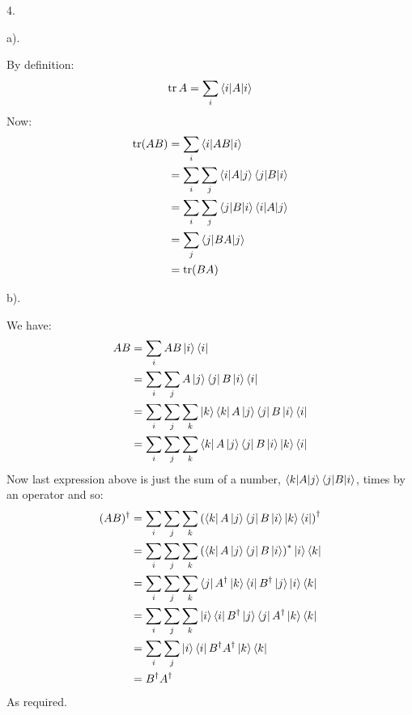 \documentclass[a4paper,12pt]{article}
\begin{document}
4.
\begin{minipage}[t]{0.9\textwidth}
  a).
  \begin{minipage}[t]{\textwidth}
    By definition:
    \begin{equation*}
      \trace{A} = \sum_i \braket{i|A|i}
    \end{equation*}
    Now:
    \begin{align*}
      \trace(AB) &= \sum_i \braket{i|AB|i}\\
                 &= \sum_i\sum_j \braket{i|A|j}\braket{j|B|i}\\
                 &= \sum_i\sum_j \braket{j|B|i}\braket{i|A|j}\\
                 &= \sum_j \braket{j|BA|j}\\
                 &= \trace(BA)
    \end{align*}

  \end{minipage}

  b).
  \begin{minipage}[t]{\textwidth}
    We have:
    \begin{align*}
      AB &= \sum_{i} AB\ket{i}\bra{i}\\
         &= \sum_{i}\sum_{j} A\ket{j} \bra{j}B\ket{i}\bra{i}\\
         &= \sum_{i}\sum_{j}\sum_{k} \ket{k} \bra{k}A\ket{j} \bra{j}B\ket{i}\bra{i}\\
         &= \sum_{i}\sum_{j}\sum_{k}  \bra{k}A\ket{j} \bra{j}B\ket{i} \ket{k}\bra{i}\\
    \end{align*}
    Now last expression above is just the sum of a number, $\braket{k|A|j}\braket{j|B|i}$, times by an operator and so:
    \begin{align*}
      (AB)^\dagger &= \sum_{i}\sum_{j}\sum_{k} \left(\bra{k}A\ket{j} \bra{j}B\ket{i} \ket{k}\bra{i}\right)^\dagger\\
                   &= \sum_{i}\sum_{j}\sum_{k} \left(\bra{k}A\ket{j} \bra{j}B\ket{i}\right)^* \ket{i}\bra{k}\\
                   &= \sum_{i}\sum_{j}\sum_{k} \bra{j}A^\dagger\ket{k} \bra{i}B^\dagger\ket{j} \ket{i}\bra{k}\\
                   &= \sum_{i}\sum_{j}\sum_{k} \ket{i}\bra{i}B^\dagger\ket{j}\bra{j}A^\dagger\ket{k}\bra{k}\\
                   &= \sum_{i}\sum_{j} \ket{i}\bra{i}B^\dagger A^\dagger\ket{k}\bra{k}\\
                   &= B^\dagger A^\dagger\\
    \end{align*}
    As required.
  \end{minipage}


\end{minipage}
\end{document}
